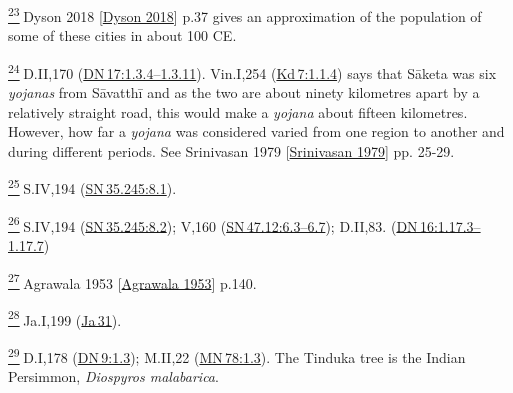 \label{footprints_split_024.html_fn23}
\hyperref[footprints_split_006.htmlux5cux23fnref23]{\textsuperscript{23}} {Dyson
2018
{{[}\hyperref[footprints_split_022.htmlux5cux23Dysonux5cux25202018]{Dyson
2018}{]}}} p.37 gives an approximation of the population of some of
these cities in about 100 CE.

\label{footprints_split_024.html_fn24}
\hyperref[footprints_split_006.htmlux5cux23fnref24]{\textsuperscript{24}} D.II,170
(\href{https://suttacentral.net/dn17/en/sujato\#1.3.4}{DN\,17:1.3.4--1.3.11}).
Vin.I,254
(\href{https://suttacentral.net/pli-tv-kd7/en/brahmali?\#1.1.4}{Kd\,7:1.1.4})
says that Sāketa was six \emph{yojanas} from Sāvatthī and as the two are
about ninety kilometres apart by a relatively straight road, this would
make a \emph{yojana} about fifteen kilometres. However, how far a
\emph{yojana} was considered varied from one region to another and
during different periods. See {Srinivasan 1979
{{[}\hyperref[footprints_split_022.htmlux5cux23Srinivasanux5cux25201979]{Srinivasan
1979}{]}}} pp. 25-29.

\label{footprints_split_024.html_fn25}
\hyperref[footprints_split_006.htmlux5cux23fnref25]{\textsuperscript{25}} S.IV,194
(\href{https://suttacentral.net/sn35.245/en/sujato\#8.1}{SN\,35.245:8.1}).

\label{footprints_split_024.html_fn26}
\hyperref[footprints_split_006.htmlux5cux23fnref26]{\textsuperscript{26}} S.IV,194
(\href{https://suttacentral.net/sn35.245/en/sujato\#8.2}{SN\,35.245:8.2});
V,160
(\href{https://suttacentral.net/sn47.12/en/sujato\#6.3}{SN\,47.12:6.3--6.7});
D.II,83.
(\href{https://suttacentral.net/dn16/en/sujato\#1.17.3}{DN\,16:1.17.3--1.17.7})

\label{footprints_split_024.html_fn27}
\hyperref[footprints_split_006.htmlux5cux23fnref27]{\textsuperscript{27}} {Agrawala
1953
{{[}\hyperref[footprints_split_022.htmlux5cux23Agrawalaux5cux25201953]{Agrawala
1953}{]}}} p.140.

\label{footprints_split_024.html_fn28}
\hyperref[footprints_split_006.htmlux5cux23fnref28]{\textsuperscript{28}} Ja.I,199
(\href{https://suttacentral.net/ja31}{Ja\,31}).

\label{footprints_split_024.html_fn29}
\hyperref[footprints_split_006.htmlux5cux23fnref29]{\textsuperscript{29}} D.I,178
(\href{https://suttacentral.net/dn9/en/sujato\#1.3}{DN\,9:1.3}); M.II,22
(\href{https://suttacentral.net/mn78/en/sujato\#1.3}{MN\,78:1.3}). The
Tinduka tree is the Indian Persimmon, \emph{Diospyros malabarica}.

